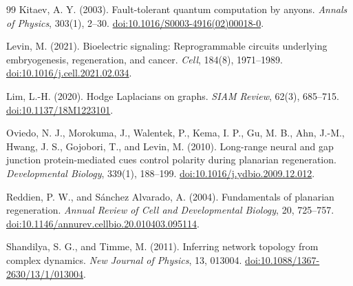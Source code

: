 \documentclass[12pt,a4paper]{article}
\begin{document}
\begin{thebibliography}{99}
Kitaev, A. Y. (2003).
Fault-tolerant quantum computation by anyons.
\emph{Annals of Physics}, 303(1), 2--30.
\href{https://doi.org/10.1016/S0003-4916(02)00018-0}{doi:10.1016/S0003-4916(02)00018-0}.

Levin, M. (2021).
Bioelectric signaling: Reprogrammable circuits underlying embryogenesis, regeneration, and cancer.
\emph{Cell}, 184(8), 1971--1989.
\href{https://doi.org/10.1016/j.cell.2021.02.034}{doi:10.1016/j.cell.2021.02.034}.

Lim, L.-H. (2020).
Hodge Laplacians on graphs.
\emph{SIAM Review}, 62(3), 685--715.
\href{https://doi.org/10.1137/18M1223101}{doi:10.1137/18M1223101}.

Oviedo, N. J., Morokuma, J., Walentek, P., Kema, I. P., Gu, M. B., Ahn, J.-M., Hwang, J. S., Gojobori, T., and Levin, M. (2010).
Long-range neural and gap junction protein-mediated cues control polarity during planarian regeneration.
\emph{Developmental Biology}, 339(1), 188--199.
\href{https://doi.org/10.1016/j.ydbio.2009.12.012}{doi:10.1016/j.ydbio.2009.12.012}.

Reddien, P. W., and S\'anchez Alvarado, A. (2004).
Fundamentals of planarian regeneration.
\emph{Annual Review of Cell and Developmental Biology}, 20, 725--757.
\href{https://doi.org/10.1146/annurev.cellbio.20.010403.095114}{doi:10.1146/annurev.cellbio.20.010403.095114}.

Shandilya, S. G., and Timme, M. (2011).
Inferring network topology from complex dynamics.
\emph{New Journal of Physics}, 13, 013004.
\href{https://doi.org/10.1088/1367-2630/13/1/013004}{doi:10.1088/1367-2630/13/1/013004}.
\end{thebibliography}
\end{document}
